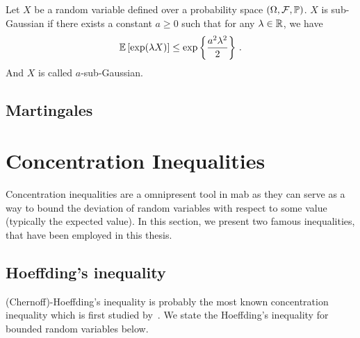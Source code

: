 \begin{definition}
\begin{leftbar}[defnbar]
Let $X$ be a random variable defined over a probability space $(\Omega,\mathcal{F},\mathbb{P})$. $X$ is sub-Gaussian if there exists a constant $a\geq 0$ such that for any $\lambda\in\mathbb{R}$, we have
\[
    \mathbb{E}\left[\exp(\lambda X)\right] \leq \exp\left\{\frac{a^2\lambda^2}{2}\right\}\,.
\]
And $X$ is called $a$-sub-Gaussian.
\end{leftbar}
\end{definition}


\subsection{Martingales}\label{app:maths.proba.martingale}

\section{Concentration Inequalities}\label{app:maths.concentration}

Concentration inequalities are a omnipresent tool in \gls{mab} as they can serve as a way to bound the deviation of random variables with respect to some value (typically the expected value). In this section, we present two famous inequalities, that have been employed in this thesis.

\subsection{Hoeffding's inequality}

(Chernoff)-Hoeffding's inequality is probably the most known concentration inequality which is first studied by~\cite{hoeffding1963}. We state the Hoeffding's inequality for bounded random variables below.

